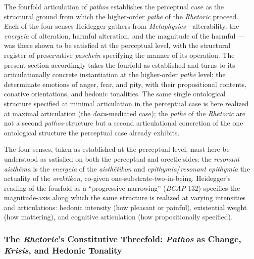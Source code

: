 \documentclass{article}
\begin{document}
The fourfold articulation of \textit{pathos} establishes the perceptual case as the structural ground from which the higher-order \textit{pathē} of the \textit{Rhetoric} proceed. Each of the four senses Heidegger gathers from \textit{Metaphysics}---alterability, the \textit{energeia} of alteration, harmful alteration, and the magnitude of the harmful --- was there shown to be satisfied at the perceptual level, with the structural register of preservative \textit{paschein} specifying the manner of its operation. The present section accordingly takes the fourfold as established and turns to its articulationally concrete instantiation at the higher-order \textit{pathē} level: the determinate emotions of anger, fear, and pity, with their propositional contents, conative orientations, and hedonic tonalities. The same single ontological structure specified at minimal articulation in the perceptual case is here realized at maximal articulation (the \textit{doxa}-mediated case); the \textit{pathē} of the \textit{Rhetoric} are not a second \textit{pathos}-structure but a second articulational concretion of the one ontological structure the perceptual case already exhibits.

The four senses, taken as established at the perceptual level, must here be understood as satisfied on both the perceptual and orectic sides: the \textit{resonant aisthēma} is the \textit{energeia} of the \textit{aisthētikon} and \textit{epithymia}/\textit{resonant epithymia} the actuality of the \textit{orektikon}, co-given one-substrate-two-in-being. Heidegger's reading of the fourfold as a ``progressive narrowing'' (\textit{BCAP} 132) specifies the magnitude-axis along which the same structure is realized at varying intensities and articulations: hedonic intensity (how pleasant or painful), existential weight (how mattering), and cognitive articulation (how propositionally specified).

\subsubsection{The \textit{Rhetoric}'s Constitutive Threefold: \textit{Pathos} as Change, \textit{Krisis}, and Hedonic Tonality}
\end{document}
